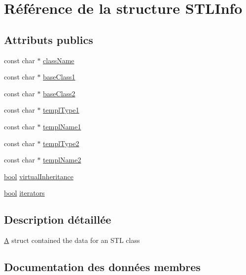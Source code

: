\hypertarget{struct_s_t_l_info}{}\section{Référence de la structure S\+T\+L\+Info}
\label{struct_s_t_l_info}
\subsection*{Attributs publics}
\begin{DoxyCompactItemize}
\item 
const char $\ast$ \hyperlink{struct_s_t_l_info_af930326a1ad3b1eeb837db81e40d6f65}{class\+Name}
\item 
const char $\ast$ \hyperlink{struct_s_t_l_info_a9a76f5f0f200d1e6b8ed433fbf1646ac}{base\+Class1}
\item 
const char $\ast$ \hyperlink{struct_s_t_l_info_a29d4a02505eaeb6cdaf416c4018c1c94}{base\+Class2}
\item 
const char $\ast$ \hyperlink{struct_s_t_l_info_a8f988e4df5b95c1083c0c45f2abac17e}{templ\+Type1}
\item 
const char $\ast$ \hyperlink{struct_s_t_l_info_acdba5b83afb48d4d5419561d6332a23e}{templ\+Name1}
\item 
const char $\ast$ \hyperlink{struct_s_t_l_info_a17ead4cbe08b8b7c09f32488b392b917}{templ\+Type2}
\item 
const char $\ast$ \hyperlink{struct_s_t_l_info_a17fe8a04bb515e521c2f1f9eea74b311}{templ\+Name2}
\item 
\hyperlink{qglobal_8h_a1062901a7428fdd9c7f180f5e01ea056}{bool} \hyperlink{struct_s_t_l_info_adf7de0dd37358cb2f21c913adab4e2bc}{virtual\+Inheritance}
\item 
\hyperlink{qglobal_8h_a1062901a7428fdd9c7f180f5e01ea056}{bool} \hyperlink{struct_s_t_l_info_aa6a51c8426777163389453b971b338eb}{iterators}
\end{DoxyCompactItemize}


\subsection{Description détaillée}
\hyperlink{class_a}{A} struct contained the data for an S\+T\+L class 

\subsection{Documentation des données membres}
\hypertarget{struct_s_t_l_info_a9a76f5f0f200d1e6b8ed433fbf1646ac}{}
